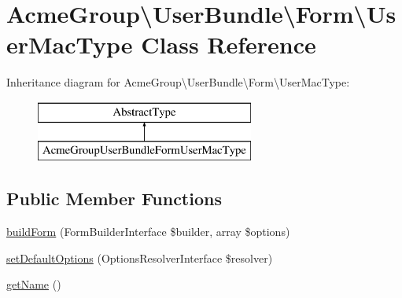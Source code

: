 \hypertarget{class_acme_group_1_1_user_bundle_1_1_form_1_1_user_mac_type}{\section{Acme\+Group\textbackslash{}User\+Bundle\textbackslash{}Form\textbackslash{}User\+Mac\+Type Class Reference}
\label{class_acme_group_1_1_user_bundle_1_1_form_1_1_user_mac_type}
}
Inheritance diagram for Acme\+Group\textbackslash{}User\+Bundle\textbackslash{}Form\textbackslash{}User\+Mac\+Type\+:\begin{figure}[H]
\begin{center}
\leavevmode
\includegraphics[height=2.000000cm]{class_acme_group_1_1_user_bundle_1_1_form_1_1_user_mac_type}
\end{center}
\end{figure}
\subsection*{Public Member Functions}
\begin{DoxyCompactItemize}
\item 
\hyperlink{class_acme_group_1_1_user_bundle_1_1_form_1_1_user_mac_type_a016a67533ba19c38aeaf68c3b9b31e27}{build\+Form} (Form\+Builder\+Interface \$builder, array \$options)
\item 
\hyperlink{class_acme_group_1_1_user_bundle_1_1_form_1_1_user_mac_type_a7726140c94c1622b4c896bb9f668cf43}{set\+Default\+Options} (Options\+Resolver\+Interface \$resolver)
\item 
\hyperlink{class_acme_group_1_1_user_bundle_1_1_form_1_1_user_mac_type_a9880b42ff915f8e6dab273c39afd57af}{get\+Name} ()
\end{DoxyCompactItemize}



